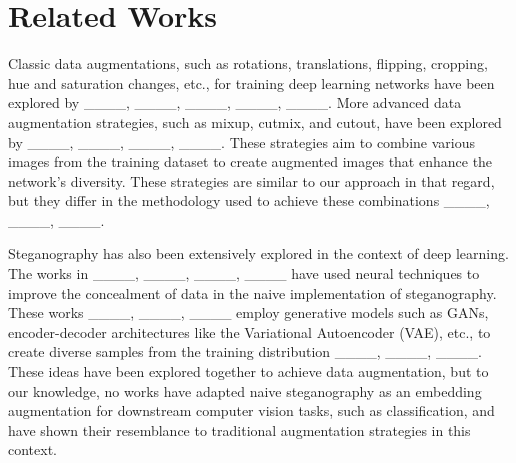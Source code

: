 \section{Related Works}
Classic data augmentations, such as rotations, translations, flipping, cropping, hue and saturation changes, etc., for training deep learning networks have been explored by ____, ____, ____, ____, ____. More advanced data augmentation strategies, such as mixup, cutmix, and cutout, have been explored by ____, ____, ____, ____. These strategies aim to combine various images from the training dataset to create augmented images that enhance the network's diversity. These strategies are similar to our approach in that regard, but they differ in the methodology used to achieve these combinations ____, ____, ____.

Steganography has also been extensively explored in the context of deep learning. The works in ____, ____, ____, ____ have used neural techniques to improve the concealment of data in the naive implementation of steganography. These works ____, ____, ____ employ generative models such as GANs, encoder-decoder architectures like the Variational Autoencoder (VAE), etc., to create diverse samples from the training distribution ____, ____, ____. These ideas have been explored together to achieve data augmentation, but to our knowledge, no works have adapted naive steganography as an embedding augmentation for downstream computer vision tasks, such as classification, and have shown their resemblance to traditional augmentation strategies in this context.